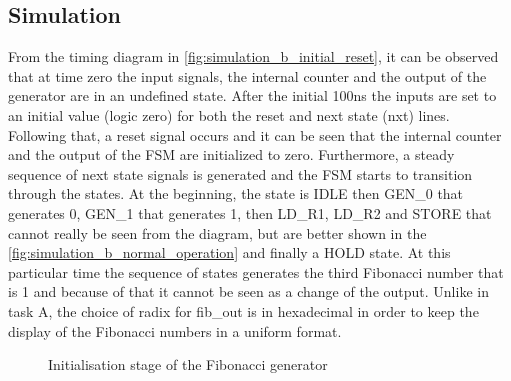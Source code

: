\documentclass[10pt]{article}
\begin{document}
\subsection{Simulation}

From the timing diagram in \autoref{fig:simulation_b_initial_reset}, it can be observed that at time zero the input signals, the internal counter and the output of the generator are in an undefined state. After the initial 100ns the inputs are set to an initial value (logic zero) for both the reset and next state (nxt) lines. Following that, a reset signal occurs and it can be seen that the internal counter and the output of the FSM are initialized to zero.
Furthermore, a steady sequence of next state signals is generated and the FSM starts to transition through the states. At the beginning, the state is IDLE then GEN\_0 that generates 0, GEN\_1 that generates 1, then LD\_R1, LD\_R2 and STORE that cannot really be seen from the diagram, but are better shown in the \autoref{fig:simulation_b_normal_operation} and finally a HOLD state. At this particular time the sequence of states generates the third Fibonacci number that is 1 and because of that it cannot be seen as a change of the output. Unlike in task A, the choice of radix for fib\_out is in hexadecimal in order to keep the display of the Fibonacci numbers in a uniform format.

\begin{figure}[ht]
    \centering
    \caption{Initialisation stage of the Fibonacci generator}
    \label{fig:simulation_b_initial_reset}
\end{figure}

\newpage
\end{document}
